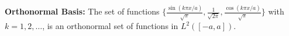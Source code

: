 {\bf Orthonormal Basis:} The set of functions $\{\frac{\sin(k\pi x/a)}{\sqrt{\pi}},\frac{1}{\sqrt{2\pi}},\frac{\cos(k\pi x/a)}{\sqrt{\pi}}\}$ with $k=1,2,\dots$, is an orthonormal set of functions in $L^2([-a,a])$.